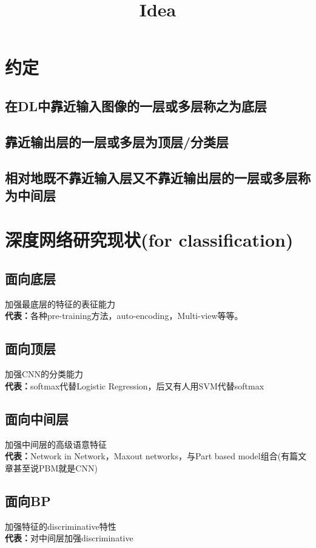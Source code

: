 \documentclass{article}
\begin{document}
\begin{CJK}{UTF8}{gbsn}
\title{Idea}

{
\color{blue}
\section*{约定}
\subsection{在DL中靠近输入图像的一层或多层称之为底层}
\subsection{靠近输出层的一层或多层为顶层/分类层}
\subsection{相对地既不靠近输入层又不靠近输出层的一层或多层称为中间层}
}

\section{深度网络研究现状(for classification)}
\subsection{面向底层}
加强最底层的特征的表征能力\\
\textbf{代表：}各种pre-training方法，auto-encoding，Multi-view\cite{sermanet2013overfeat}等等。
\subsection{面向顶层}
加强CNN的分类能力\\
\textbf{代表：}softmax代替Logistic Regression，后又有人用SVM代替softmax\cite{tang2013deep}
\subsection{面向中间层}
加强中间层的高级语意特征\\
\textbf{代表：}Network in Network\cite{NIN}，Maxout networks\cite{goodfellow2013maxout}，与Part based model组合\cite{ouyang2013joint}(有篇文章甚至说PBM就是CNN\cite{zeiler2011adaptive})
\subsection{面向BP}
加强特征的discriminative特性\\
\textbf{代表：}对中间层加强discriminative\cite{lee2014deeply}

\end{CJK}
\end{document}
